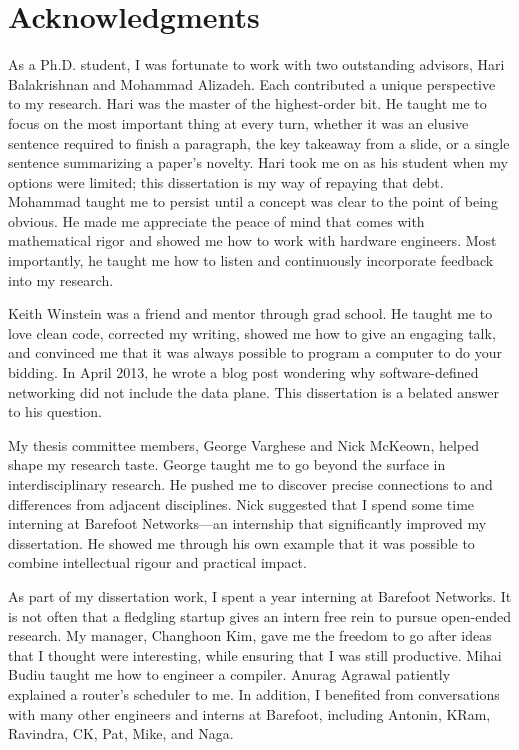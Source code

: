 \chapter*{Acknowledgments}
%

As a Ph.D. student, I was fortunate to work with two outstanding advisors, Hari
Balakrishnan and Mohammad Alizadeh. Each contributed a unique perspective to my
research.  Hari was the master of the highest-order bit. He taught me to focus
on the most important thing at every turn, whether it was an elusive sentence
required to finish a paragraph, the key takeaway from a slide, or a single
sentence summarizing a paper's novelty. Hari took me on as his student when my
options were limited; this dissertation is my way of repaying that debt.
Mohammad taught me to persist until a concept was clear to the point of being
obvious. He made me appreciate the peace of mind that comes with mathematical
rigor and showed me how to work with hardware engineers.  Most importantly, he
taught me how to listen and continuously incorporate feedback into my research.

Keith Winstein was a friend and mentor through grad school. He taught me to
love clean code, corrected my writing, showed me how to give an engaging talk,
and convinced me that it was always possible to program a computer to do your
bidding. In April 2013, he wrote a blog post wondering why software-defined
networking did not include the data plane. This dissertation is a belated
answer to his question.

My thesis committee members, George Varghese and Nick McKeown, helped shape my
research taste. George taught me to go beyond the surface in interdisciplinary
research. He pushed me to discover precise connections to and differences from
adjacent disciplines. Nick suggested that I spend some time interning at
Barefoot Networks---an internship that significantly improved my dissertation.
He showed me through his own example that it was possible to combine
intellectual rigour and practical impact.

As part of my dissertation work, I spent a year interning at Barefoot Networks.
It is not often that a fledgling startup gives an intern free rein to pursue
open-ended research. My manager, Changhoon Kim, gave me the freedom to go after
ideas that I thought were interesting, while ensuring that I was still
productive.  Mihai Budiu taught me how to engineer a compiler. Anurag Agrawal
patiently explained a router's scheduler to me. In addition, I benefited from
conversations with many other engineers and interns at Barefoot, including
Antonin, KRam, Ravindra, CK, Pat, Mike, and Naga.


